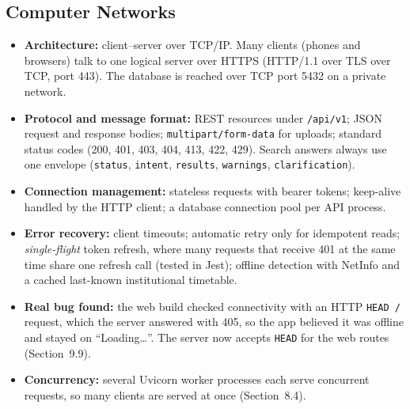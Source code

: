 \subsection{Computer Networks}
\begin{itemize}
\item \textbf{Architecture:} client--server over TCP/IP. Many clients (phones and browsers) talk to
      one logical server over HTTPS (HTTP/1.1 over TLS over TCP, port 443). The database is reached over
      TCP port 5432 on a private network.
\item \textbf{Protocol and message format:} REST resources under \texttt{/api/v1}; JSON request and
      response bodies; \texttt{multipart/form-data} for uploads; standard status codes (200, 401, 403,
      404, 413, 422, 429). Search answers always use one envelope
      (\texttt{status}, \texttt{intent}, \texttt{results}, \texttt{warnings}, \texttt{clarification}).
\item \textbf{Connection management:} stateless requests with bearer tokens; keep-alive handled
      by the HTTP client; a database connection pool per API process.
\item \textbf{Error recovery:} client timeouts; automatic retry only for idempotent reads;
      \emph{single-flight} token refresh, where many requests that receive 401 at the same time share
      one refresh call (tested in Jest); offline detection with NetInfo and a cached last-known
      institutional timetable.
\item \textbf{Real bug found:} the web build checked connectivity with an HTTP \texttt{HEAD /}
      request, which the server answered with 405, so the app believed it was offline and stayed
      on ``Loading\ldots''. The server now accepts \texttt{HEAD} for the web routes (Section~9.9).
\item \textbf{Concurrency:} several Uvicorn worker processes each serve concurrent requests, so many
      clients are served at once (Section~8.4).
\end{itemize}

